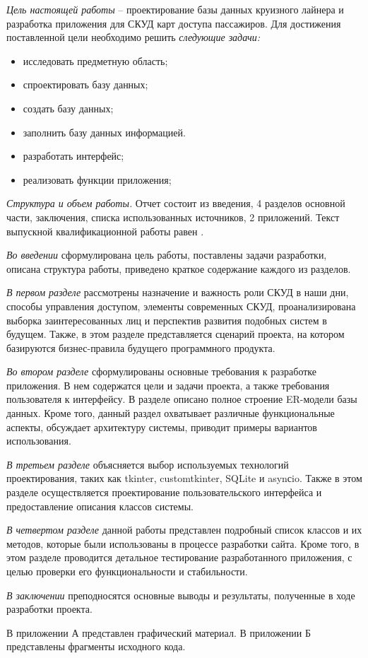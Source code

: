 \emph{Цель настоящей работы} – проектирование базы данных круизного лайнера и разработка приложения для СКУД карт доступа пассажиров. Для достижения поставленной цели необходимо решить \emph{следующие задачи:}
\begin{itemize}
\item исследовать предметную область;
\item спроектировать базу данных;
\item создать базу данных;
\item заполнить базу данных информацией.
\item разработать  интерфейс;
\item реализовать функции приложения;
\end{itemize}

\emph{Структура и объем работы.} Отчет состоит из введения, 4 разделов основной части, заключения, списка использованных источников, 2 приложений. Текст выпускной квалификационной работы равен .

\emph{Во введении} сформулирована цель работы, поставлены задачи разработки, описана структура работы, приведено краткое содержание каждого из разделов.

\emph{В первом разделе} рассмотрены назначение и важность роли СКУД в наши дни, способы управления доступом, элементы современных СКУД, проанализирована выборка заинтересованных лиц и перспектив развития подобных систем в будущем. Также, в этом разделе представляется сценарий проекта, на котором базируются бизнес-правила будущего программного продукта.

\emph{Во втором разделе} сформулированы основные требования к разработке приложения. В нем содержатся цели и задачи проекта, а также требования пользователя к интерфейсу. В разделе описано полное строение ER-модели базы данных. Кроме того, данный раздел охватывает различные функциональные аспекты, обсуждает архитектуру системы, приводит примеры вариантов использования.

\emph{В третьем разделе} объясняется выбор используемых технологий проектирования, таких как tkinter, customtkinter, SQLite и asynсio. Также в этом разделе осуществляется проектирование пользовательского интерфейса и предоставление описания классов системы.

\emph{В четвертом разделе} данной работы представлен подробный список классов и их методов, которые были использованы в процессе разработки сайта. Кроме того, в этом разделе проводится детальное тестирование разработанного приложения, с целью проверки его функциональности и стабильности.

\emph{В заключении} преподносятся основные выводы и результаты, полученные в ходе разработки проекта.

В приложении А представлен графический материал.
В приложении Б представлены фрагменты исходного кода. 
